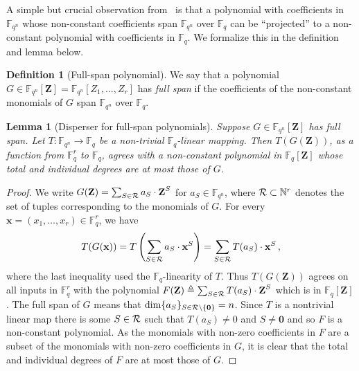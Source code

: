 \documentclass[10pt]{article}
\newtheorem{lemma}[theorem]{Lemma}
\theoremstyle{definition}
\newtheorem{definition}[theorem]{Definition}
\numberwithin{equation}{section}
\newcommand{\F}{\mathbb F_q}
\newcommand{\Fn}{\mathbb F_{q^n}}
\newcommand{\zero}{\{\textbf{0}\}}
\newcommand{\zi}{\textbf{Z}}
\begin{document}
A simple but crucial observation from~\cite{DG10} is that a polynomial with coefficients in $\Fn$ whose
non-constant coefficients span $\Fn$ over $\F$ can be ``projected'' to a non-constant polynomial with coefficients
in $\F$. We formalize this in the definition and lemma below.
%
%
%
%
\begin{definition}[Full-span polynomial]
  We say that a polynomial $G\in \Fn[\zi]=\Fn[Z_1,\ldots,Z_r]$ has \emph{full span}
  if the coefficients of the non-constant monomials of $G$
  span $\Fn$ over $\F$.

\end{definition}
\begin{lemma}[Disperser for full-span polynomials]\label{lem-can_project_expanding}
Suppose $G\in \Fn[\zi]$ has full span. Let $T:\Fn \to \F$ be a non-trivial $\F$-linear mapping.
Then $T(G(\zi))$, as a function from $\F^r$ to $\F$, agrees with a non-constant polynomial in $\F[\zi]$
whose total and individual degrees are at most those of $G$.
\end{lemma}
\begin{proof}
We write  $G(\zi)= \sum_{S\in {\cal R}} a_S\cdot
\zi^S$ for  $a_S\in \Fn$, where ${\cal R}\subset {\mathbb N}^r$ denotes the set of tuples corresponding
to the monomials of $G$.
For every $\mathbf{x}=(x_1,\ldots,x_r) \in \F^r$, we have
\[T(G(\mathbf{x})) = T\left( \sum_{S\in {\cal R}} a_S\cdot
\mathbf{x}^S\right) = \sum_{S\in {\cal R}}T(a_S)\cdot \mathbf{x}^S\,,\]
where the last inequality used the $\F$-linearity of $T$.
Thus $T(G(\zi))$ agrees on all inputs in $\F^r$ with the polynomial
$F(\zi)\triangleq \sum_{S\in {\cal R}}T(a_S)\cdot \mathbf{\zi} ^S$ which
is in $\F[\zi]$.
The full span of $G$ means that
  $\dim \{a_S\}_{S\in {\cal R}\setminus
\zero}=n$. Since $T$ is a nontrivial linear map there is some $S \in {\cal R}$ such that $T(a_S)\neq 0$ and $S\neq \mathbf{0}$
and so $F$ is a non-constant polynomial.
As the monomials with non-zero coefficients in
$F$ are a subset of the monomials with non-zero coefficients in $G$,
it is clear that
%
%
the total and individual degrees of $F$
%
are at most those of $G$.
\end{proof}
\end{document}
